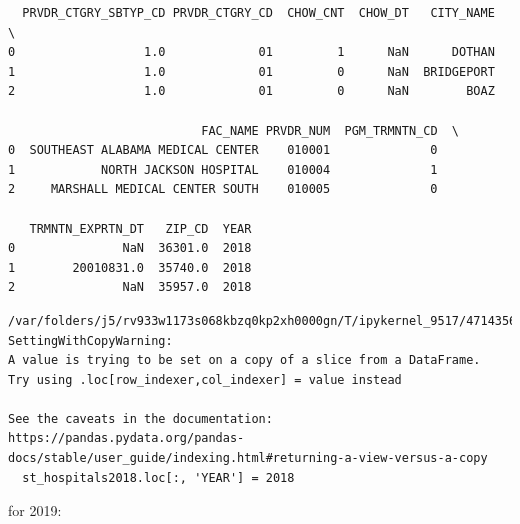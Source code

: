 \documentclass[
  letterpaper,
  DIV=11,
  numbers=noendperiod]{scrartcl}
\begin{document}
\begin{verbatim}
  PRVDR_CTGRY_SBTYP_CD PRVDR_CTGRY_CD  CHOW_CNT  CHOW_DT   CITY_NAME  \
0                  1.0             01         1      NaN      DOTHAN   
1                  1.0             01         0      NaN  BRIDGEPORT   
2                  1.0             01         0      NaN        BOAZ   

                           FAC_NAME PRVDR_NUM  PGM_TRMNTN_CD  \
0  SOUTHEAST ALABAMA MEDICAL CENTER    010001              0   
1            NORTH JACKSON HOSPITAL    010004              1   
2     MARSHALL MEDICAL CENTER SOUTH    010005              0   

   TRMNTN_EXPRTN_DT   ZIP_CD  YEAR  
0               NaN  36301.0  2018  
1        20010831.0  35740.0  2018  
2               NaN  35957.0  2018  
\end{verbatim}

\begin{verbatim}
/var/folders/j5/rv933w1173s068kbzq0kp2xh0000gn/T/ipykernel_9517/471435673.py:2: SettingWithCopyWarning: 
A value is trying to be set on a copy of a slice from a DataFrame.
Try using .loc[row_indexer,col_indexer] = value instead

See the caveats in the documentation: https://pandas.pydata.org/pandas-docs/stable/user_guide/indexing.html#returning-a-view-versus-a-copy
  st_hospitals2018.loc[:, 'YEAR'] = 2018
\end{verbatim}

for 2019:
\end{document}
